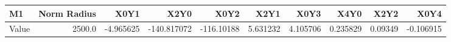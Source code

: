 \documentclass[convert={convertexe={magick.exe}, density={150}}]{standalone}
\begin{document}
\begin{tabular}{lrrrrrrrrr}
\toprule
\bf{M1} &  Norm Radius &      X0Y1 &        X2Y0 &       X0Y2 &      X2Y1 &      X0Y3 &      X4Y0 &     X2Y2 &      X0Y4 \\
\midrule
Value &       2500.0 & -4.965625 & -140.817072 & -116.10188 &  5.631232 &  4.105706 &  0.235829 &  0.09349 & -0.106915 \\
\bottomrule
\end{tabular}
\end{document}
